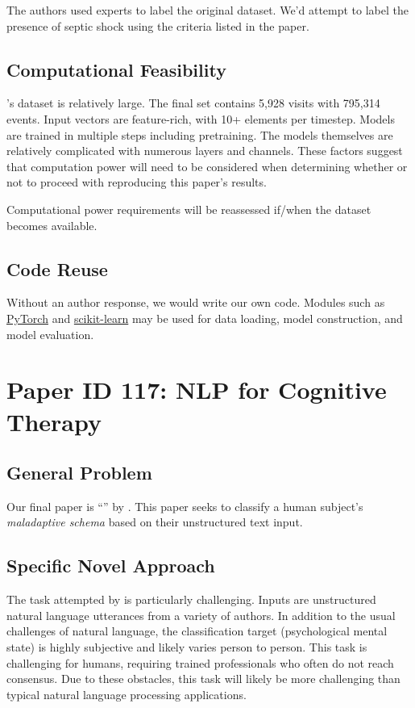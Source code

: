 \documentclass[11pt,a4paper]{article}
\begin{document}
The authors used experts to label the original dataset. We'd attempt to label the presence of septic shock using the criteria listed in the paper.

\subsection{Computational Feasibility}

\citeauthor{zhang_2019}'s \citeyearpar{zhang_2019} dataset is relatively large. The final set contains 5,928 visits with 795,314 events. Input vectors are feature-rich, with 10+ elements per timestep. Models are trained in multiple steps including pretraining. The models themselves are relatively complicated with numerous layers and channels. These factors suggest that computation power will need to be considered when determining whether or not to proceed with reproducing this paper's results. 

Computational power requirements will be reassessed if/when the dataset becomes available. 

\subsection{Code Reuse}
Without an author response, we would write our own code. Modules such as \href{https://pytorch.org/}{PyTorch} and \href{https://scikit-learn.org/stable/}{scikit-learn} may be used for data loading, model construction, and model evaluation. 

\section{Paper ID 117: NLP for Cognitive Therapy}
\subsection{General Problem}
Our final paper is ``'' by \citeauthor*{burger_2021}. This paper seeks to classify a human subject's \emph{maladaptive schema} based on their unstructured text input. 

\subsection{Specific Novel Approach}
The task attempted by \citet{burger_2021} is particularly challenging. Inputs are unstructured natural language utterances from a variety of authors. In addition to the usual challenges of natural language, the classification target (psychological mental state) is highly subjective and likely varies person to person. This task is challenging for humans, requiring trained professionals who often do not reach consensus. Due to these obstacles, this task will likely be more challenging than typical natural language processing applications. 
\end{document}
